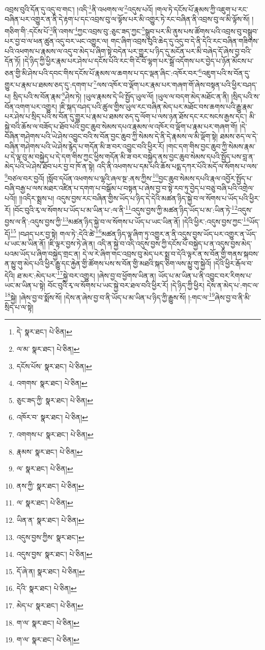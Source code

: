 འབྲས་བུའི་དོན་དུ་འདུ་བ་གང་། །འདི་\footnote{དེ་  སྣར་ཐང་།  པེ་ཅིན། }ནི་འཕགས་ལ་\footnote{ལ་མ་  སྣར་ཐང་།  པེ་ཅིན། }འདུས་པའོ། །གལ་ཏེ་དངོས་པོ་རྣམས་ཀྱི་འཇུག་པ་རང་བཞིན་པར་འགྱུར་ན་ནི་དེ་རྟག་པ་དང་འབྲས་བུ་ལ་ལྟོས་པར་མི་འགྱུར་ཏེ་རང་བཞིན་ནི་འབྲས་བུ་ལ་མི་ལྟོས་སོ། །གཅིག་གི་:དངོས་པོ་\footnote{དངོས་པོས་  སྣར་ཐང་།  པེ་ཅིན། }ནི་འགས་\footnote{འགགས་  སྣར་ཐང་།  པེ་ཅིན། }ཀྱང་འབྲས་བུ་:ཅུང་ཟད་ཀྱང་\footnote{ཅུང་ཟད་ཀྱི་  སྣར་ཐང་།  པེ་ཅིན། }སྒྲུབ་པར་མི་ནུས་པས་ཚོགས་པའི་འབྲས་བུ་བསྒྲུབ་པར་བྱ་བ་ལ་ཕན་ཚུན་འདུ་བར་ཡང་འགྱུར་ལ། གང་ཞིག་འབྲས་བུའི་ཆེད་དུ་འདུ་བ་དེ་ནི་དེའི་རང་བཞིན་གཟིགས་པའི་འཕགས་པ་རྣམས་ལ་འདུ་བ་མེད་པ་ཞིག་སྟེ་བདེན་པར་གྱུར་པ་ཉིད་དུ་མངོན་པར་མི་བཞེད་དོ་ཞེས་བྱ་བའི་དོན་ཏོ། །དེ་ཉིད་ཀྱི་ཕྱིར་རྣམ་པར་ཤེས་པ་དངོས་པོའི་རང་གི་ངོ་བོ་ལྷག་པར་སྒྲོ་འདོགས་པར་བྱེད་པ་ཉོན་མོངས་པ་ཅན་གྱི་མི་ཤེས་པའི་དབང་གིས་དངོས་པོ་རྣམས་ལ་ཆགས་པ་དང་ལྡན་ཞིང་:འཁོར་བར་\footnote{འཁོར་བ་  སྣར་ཐང་།  པེ་ཅིན། }འཇུག་པའི་ས་བོན་དུ་གྱུར་པ་རྣམ་པ་ཐམས་ཅད་དུ་:དགག་པ་\footnote{འགགས་པ་  སྣར་ཐང་།  པེ་ཅིན། }ལས་འཁོར་བ་ལྡོག་པར་རྣམ་པར་གཞག་གོ་ཞེས་བསྟན་པའི་ཕྱིར་བཤད་པ། སྲིད་པའི་ས་བོན་རྣམ་\footnote{རྣམས་  སྣར་ཐང་།  པེ་ཅིན། }ཤེས་ཏེ། །ཡུལ་རྣམས་དེ་ཡི་སྤྱོད་ཡུལ་ལོ། །ཡུལ་ལ་བདག་མེད་མཐོང་ན་ནི། །སྲིད་པའི་ས་བོན་འགག་པར་འགྱུར། །ཇི་སྐད་བཤད་པའི་ཚུལ་གྱིས་ཡུལ་རང་བཞིན་མེད་པར་མཐོང་བས་ཆགས་པའི་རྒྱུ་རྣམ་པར་ཤེས་པ་སྲིད་པའི་ས་བོན་དུ་གྱུར་པ་རྣམ་པ་ཐམས་ཅད་དུ་ལོག་པ་ལས་ཉན་ཐོས་དང་རང་སངས་རྒྱས་དང་། མི་སྐྱེ་བའི་ཆོས་ལ་བཟོད་པ་ཐོབ་པའི་བྱང་ཆུབ་སེམས་དཔའ་རྣམས་ལ་འཁོར་བ་ལྡོག་པ་རྣམ་པར་གཞག་གོ། །དེ་བཞིན་གཤེགས་པའི་ཡེ་ཤེས་འབྱུང་བའི་ས་བོན་བྱང་ཆུབ་ཀྱི་སེམས་དེ་ནི་དེ་རྣམས་ལ་མི་ལྡོག་སྟེ། ཐམས་ཅད་ལ་དེ་བཞིན་གཤེགས་པའི་ཡེ་ཤེས་རྙེད་པ་གདོན་མི་ཟ་བར་འབྱུང་བའི་ཕྱིར་རོ། །གང་དག་གིས་བྱང་ཆུབ་ཀྱི་སེམས་རྣམ་པ་དེ་ལྟ་བུ་མ་བསྐྱེད་པ་དེ་དག་གིས་ཀྱང་ཕྱིས་གདོན་མི་ཟ་བར་བསྐྱེད་ནས་བྱང་ཆུབ་སེམས་དཔའི་སྤྱོད་པས་བླ་ན་མེད་པའི་ཡེ་ཤེས་ཐོབ་པར་བྱ་བ་ཁོ་ན་སྟེ། འདི་ནི་འཕགས་པ་དམ་པའི་ཆོས་པདྨ་དཀར་པོའི་མདོ་ལ་སོགས་པ་ལས་\footnote{ལ་  སྣར་ཐང་།  པེ་ཅིན། }བཙལ་བར་བྱའོ། །སློབ་དཔོན་འཕགས་པ་ལྷའི་ཞལ་སྔ་:ནས་ཀྱིས་\footnote{ནས་ཀྱི་  སྣར་ཐང་།  པེ་ཅིན། }བྱང་ཆུབ་སེམས་དཔའི་རྣལ་འབྱོར་སྤྱོད་པ་བཞི་བརྒྱ་པ་ལས་མཐར་འཛིན་པ་དགག་པ་བསྒོམ་པ་བསྟན་པ་ཞེས་བྱ་བ་སྟེ་རབ་ཏུ་བྱེད་པ་བཅུ་བཞི་པའི་འགྲེལ་པའོ།། །།འདིར་སྨྲས་པ། འདུས་བྱས་རང་བཞིན་གྱིས་ཡོད་པ་ཉིད་དེ་དེའི་མཚན་ཉིད་སྐྱེ་བ་ལ་སོགས་པ་ཡོད་པའི་ཕྱིར་རོ། །བོང་བུའི་རྭ་ལ་སོགས་པ་ཡོད་པ་མ་ཡིན་པ་:ལ་ནི་\footnote{ལ་  སྣར་ཐང་།  པེ་ཅིན། }འདུས་བྱས་ཀྱི་མཚན་ཉིད་ཡོད་པ་མ་:ཡིན་ཏེ་\footnote{ཡིན་ན་  སྣར་ཐང་།  པེ་ཅིན། }འདུས་བྱས་ལ་ནི་:འདུས་བྱས་ཀྱི་\footnote{འདུས་བྱས་ཀྱིས་  སྣར་ཐང་། }མཚན་ཉིད་སྐྱེ་བ་ལ་སོགས་པ་ཡོད་པ་ཡང་ཡིན་ནོ། །དེའི་ཕྱིར་:འདུས་བྱས་ཀྱང་\footnote{འདུས་བྱས་  སྣར་ཐང་།  པེ་ཅིན། }ཡོད་དོ།\footnote{དོ་ཞེ་ན།  སྣར་ཐང་།  པེ་ཅིན། } །བཤད་པར་བྱ་སྟེ། གལ་ཏེ་:དེའི་ཚེ་\footnote{དེའི་  སྣར་ཐང་།  པེ་ཅིན། }མཚན་ཉིད་ལྟ་ཞིག་ཏུ་འགྱུར་ན་ནི་འདུས་བྱས་ཡོད་པར་འགྱུར་ན་ཡོད་པ་ཡང་མ་ཡིན་ནོ། །ཇི་ལྟར་བྱས་ཏེ་ཞེ་ན། འདི་ན་སྐྱེ་བ་འདི་འདུས་བྱས་ཀྱི་དངོས་པོ་བསྐྱེད་པ་ན་འདུས་བྱས་མེད་པའམ་ཡོད་པ་ཞིག་བསྐྱེད་གྲང་ན། དེ་ལ་རེ་ཞིག་གང་འབྲས་བུ་མེད་པར་སྨྲ་བ་དེའི་ལྟར་ན་ས་བོན་གྱི་གནས་སྐབས་ན་མྱུ་གུ་མེད་པའི་ཕྱིར་རྒྱུ་དང་རྐྱེན་གྱི་ཚོགས་པས་ས་བོན་གྱི་མཐའི་སྐད་ཅིག་ལས་མྱུ་གུ་སྐྱེའོ། །དེའི་ཕྱིར་རྒོལ་བ་དེའི། ཐ་མར་:མེད་པར་\footnote{མེད་པ་  སྣར་ཐང་།  པེ་ཅིན། }སྐྱེ་བར་འགྱུར། །ཞེས་བྱ་བ་ཕྱོགས་ཡིན་ན། ཡོད་པ་མ་ཡིན་པ་ནི་འབྱུང་བར་རིགས་པ་ཡང་མ་ཡིན་པ་སྟེ། བོང་བུའི་རྭ་ལ་སོགས་པ་ཡང་སྐྱེ་བར་ཐལ་བའི་ཕྱིར་རོ། །དེ་ཉིད་ཀྱི་ཕྱིར། དེས་ན་མེད་པ་:གང་ལ་\footnote{ག་ལ་  སྣར་ཐང་།  པེ་ཅིན། }སྐྱེ། །ཞེས་བྱ་བ་སྨོས་སོ། །དེས་ན་ཞེས་བྱ་བ་ནི་ཡོད་པ་མ་ཡིན་པ་ཉིད་ཀྱི་རྒྱུས་སོ། །:གང་ལ་\footnote{ག་ལ་  སྣར་ཐང་།  པེ་ཅིན། }ཞེས་བྱ་བ་ནི་མི་སྲིད་པ་ལ་སྟེ། 